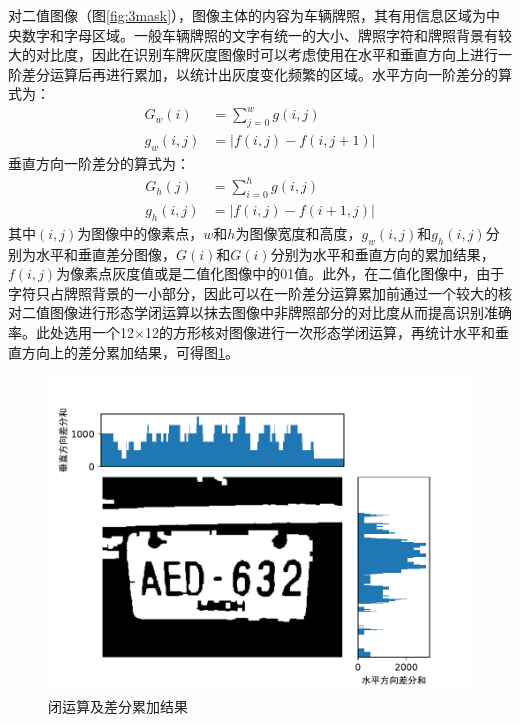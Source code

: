 \documentclass[a4paper]{ctexart}
\begin{document}
\begin{spacing}{1.35}
	对二值图像（图\ref{fig:3mask}），图像主体的内容为车辆牌照，其有用信息区域为中央数字和字母区域。一般车辆牌照的文字有统一的大小、牌照字符和牌照背景有较大的对比度，因此在识别车牌灰度图像时可以考虑使用在水平和垂直方向上进行一阶差分运算后再进行累加，以统计出灰度变化频繁的区域\cite{RN160}。水平方向一阶差分的算式为：
	\begin{equation}
		\begin{split}
			G_w(i)&=\sum_{j=0}^wg(i,j)\\
			g_w(i,j)&=|f(i,j)-f(i,j+1)|
		\end{split}
	\end{equation}
	垂直方向一阶差分的算式为：
	\begin{equation}
		\begin{split}
			G_h(j)&=\sum_{i=0}^hg(i,j)\\
			g_h(i,j)&=|f(i,j)-f(i+1,j)|
		\end{split}
	\end{equation}
	其中$(i,j)$为图像中的像素点，$w$和$h$为图像宽度和高度，$g_w(i,j)$和$g_h(i,j)$分别为水平和垂直差分图像，$G(i)$和$G(i)$分别为水平和垂直方向的累加结果，$f(i,j)$为像素点灰度值或是二值化图像中的01值。此外，在二值化图像中，由于字符只占牌照背景的一小部分，因此可以在一阶差分运算累加前通过一个较大的核对二值图像进行形态学闭运算以抹去图像中非牌照部分的对比度从而提高识别准确率\cite{RN161}。此处选用一个12$\times$12的方形核对图像进行一次形态学闭运算，再统计水平和垂直方向上的差分累加结果，可得图\ref{fig:3ghist}。
	\begin{figure}[htbp]
		\centering
		\includegraphics[width=\textwidth]{figure/3Ghist.pdf}
		\caption{闭运算及差分累加结果}\label{fig:3ghist}

\end{figure}
\end{spacing}
\end{document}
